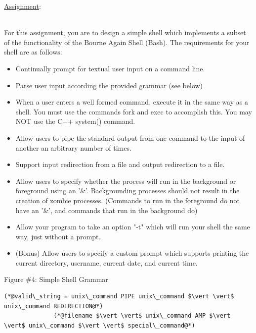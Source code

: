 \documentclass[12pt]{extarticle}
\newenvironment{myindentpar}[1]%
 {\begin{list}{}%
         {\setlength{\leftmargin}{#1}}%
         \item[]%
 }
 {\end{list}}
\begin{document}
\newpage
\noindent
{\large \underline{Assignment}:}

\begin{myindentpar}{5mm}

\vspace{-2mm}
\ \\
For this assignment, you are to design a simple shell which implements a subset of the functionality of the Bourne Again Shell (Bash).  The requirements for your shell are as follows:

\begin{itemize}
    \setlength\itemsep{-0.1em}

    \item Continually prompt for textual user input on a command line.
    \item Parse user input according the provided grammar (see below)
    \item When a user enters a well formed command, execute it in the same way as a shell.  You must use the commands fork and exec to accomplish this.  You may NOT use the C++ system() command.  
    \item Allow users to pipe the standard output from one command to the input of another an arbitrary number of times.  
    \item Support input redirection from a file and output redirection to a file.  
    \item Allow users to specify whether the process will run in the background or foreground using an '\&'.  Backgrounding processes should not result in the creation of zombie processes.  (Commands to run in the foreground do not have an '\&', and commands that run in the background do)
    \item Allow your program to take an option "-t" which will run your shell the same way, just without a prompt.  
    \item (Bonus) Allow users to specify a custom prompt which supports printing the current directory, username, current date, and current time.  

\end{itemize}

\begin{center}
    Figure \#4: Simple Shell Grammar
\end{center}
\begin{lstlisting}[frame=single]
(*@valid\_string = unix\_command PIPE unix\_command $\vert \vert$ unix\_command REDIRECTION@*)
              (*@filename $\vert \vert$ unix\_command AMP $\vert \vert$ unix\_command $\vert \vert$ special\_command@*)


\end{lstlisting}
\end{myindentpar}
\end{document}
